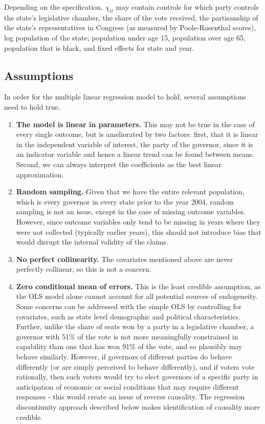 \documentclass{article}
\begin{document}
Depending on the specification, $\chi_{it}$ may contain controls for which party controls the state's legislative chamber, the share of the vote received, the partisanship of the state's representatives in Congress (as measured by Poole-Rosenthal scores), log population of the state, population under age 15, population over age 65, population that is black, and fixed effects for state and year. 

\subsection{Assumptions}

In order for the multiple linear regression model to hold, several assumptions need to hold true.
\begin{enumerate}
\item \textbf{The model is linear in parameters.} This may not be true in the case of every single outcome, but is ameliorated by two factors: first, that it is linear in the independent variable of interest, the party of the governor, since it is an indicator variable and hence a linear trend can be found between means. Second, we can always interpret the coefficients as the best linear approximation.

\item \textbf{Random sampling.} Given that we have the entire relevant population, which is every governor in every state prior to the year 2004, random sampling is not an issue, except in the case of missing outcome variables. However, since outcome variables only tend to be missing in years where they were not collected (typically earlier years), this should not introduce bias that would disrupt the internal validity of the claims.

\item \textbf{No perfect collinearity.} The covariates mentioned above are never perfectly collinear, so this is not a concern. 

\item \textbf{Zero conditional mean of errors.} This is the least credible assumption, as the OLS model alone cannot account for all potential sources of endogeneity. Some concerns can be addressed with the simple OLS by controlling for covariates, such as state level demographic and political characteristics. Further, unlike the share of seats won by a party in a legislative chamber, a governor with 51\% of the vote is not more meaningfully constrained in capability than one that has won 91\% of the vote, and so plausibly may behave similarly. However, if governors of different parties do behave differently (or are simply perceived to behave differently), and if voters vote rationally, then such voters would try to elect governors of a specific party in anticipation of economic or social conditions that may require different responses - this would create an issue of reverse causality. The regression discontinuity approach described below makes identification of causality more credible.


\end{enumerate}
\end{document}
